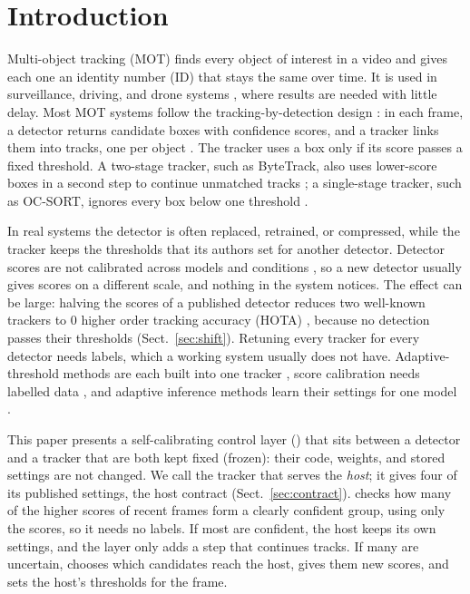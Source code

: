\section{Introduction}\label{sec:intro}

Multi-object tracking (MOT) finds every object of interest in a video and gives each one an
identity number (ID) that stays the same over time. It is used in surveillance, driving, and drone
systems \cite{zhu2022visdrone,wu2022uavsurvey}, where results are needed with little delay. Most
MOT systems follow the tracking-by-detection design \cite{adzemovic2026survey}: in each frame, a
detector returns candidate boxes with confidence scores, and a tracker links them into tracks, one
per object \cite{bewley2016sort,zhang2022bytetrack,cao2023ocsort}. The tracker uses a box only if
its score passes a fixed threshold. A two-stage tracker, such as ByteTrack, also uses lower-score
boxes in a second step to continue unmatched tracks \cite{zhang2022bytetrack}; a single-stage
tracker, such as OC-SORT, ignores every box below one threshold \cite{cao2023ocsort}.

In real systems the detector is often replaced, retrained, or compressed, while the tracker keeps
the thresholds that its authors set for another detector. Detector scores are not calibrated across
models and conditions \cite{kuppers2020detcalib}, so a new detector usually gives scores on a
different scale, and nothing in the system notices. The effect can be large: halving the scores of
a published detector reduces two well-known trackers to 0 higher order tracking accuracy (HOTA)
\cite{luiten2021hota}, because no detection passes their thresholds (Sect.~\ref{sec:shift}).
Retuning every tracker for every detector needs labels, which a working system usually does not
have. Adaptive-threshold methods are each built into one tracker
\cite{ma2023adaptivebytetrack,shim2024adaptrack,act2026adaptive}, score calibration needs
labelled data \cite{kuppers2020detcalib}, and adaptive inference methods learn their settings for
one model \cite{han2022dynamic,jiang2018chameleon}.

This paper presents a self-calibrating control layer (\scl{}) that sits between a detector and a
tracker that are both kept fixed (frozen): their code, weights, and stored settings are not
changed. We call the tracker that \scl{} serves the \emph{host}; it gives \scl{} four of its
published settings, the host contract (Sect.~\ref{sec:contract}). \scl{} checks how many of the
higher scores of recent frames form a clearly confident group, using only the scores, so it needs
no labels. If most are confident, the host keeps its own settings, and the layer only adds a step
that continues tracks. If many are uncertain, \scl{} chooses which candidates reach the host, gives
them new scores, and sets the host's thresholds for the frame.

